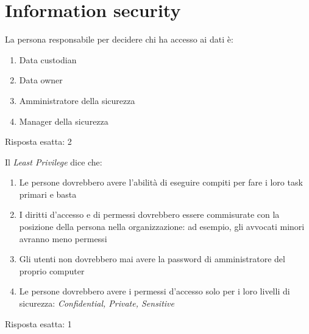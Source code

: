 \chapter{Information security}
\label{EsBCDR3}


\begin{Exercise} [
  title={Gestione dei dati},
  label={bcdr6}
 ]
 
 \Question La persona responsabile per decidere chi ha accesso ai dati è:
 \begin{enumerate}
   \item Data custodian
   \item Data owner
   \item Amministratore della sicurezza
   \item Manager della sicurezza
 \end{enumerate}
\end{Exercise}


\begin{Answer} [
  ref={bcdr6},
  number={6}
  ]
  
  \Question Risposta esatta: 2
  
\end{Answer}


\begin{Exercise} [
  title={Gestione dei dati},
  label={bcdr7}
  ]
  
  \Question Il \textit{Least Privilege} dice che:
  \begin{enumerate}
    \item Le persone dovrebbero avere l'abilità di eseguire compiti per fare i 
    loro task primari e basta
    \item I diritti d'accesso e di permessi dovrebbero essere commisurate con 
    la posizione della persona nella organizzazione: ad esempio, gli avvocati 
    minori avranno meno permessi
    \item Gli utenti non dovrebbero mai avere la password di amministratore del 
    proprio computer
    \item Le persone dovrebbero avere i permessi d'accesso solo per i loro 
    livelli di sicurezza: \textit{Confidential, Private, Sensitive}
  \end{enumerate}
\end{Exercise}


\begin{Answer} [
  ref={bcdr7},
  number={7}
  ]
  
  \Question Risposta esatta: 1
  
\end{Answer}

